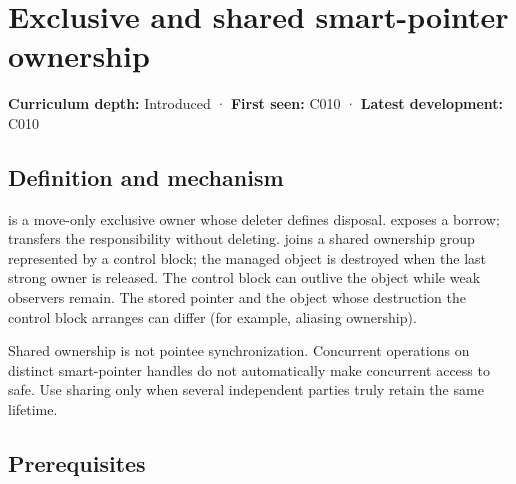 \hypertarget{appendix-51602cabe815}{}\label{referencestart:appendix-51602cabe815}
\section{Exclusive and shared smart-pointer ownership}\label{appendix-51602cabe815-exclusive-and-shared-smart-pointer-ownership}

\hypertarget{appendix-51602cabe815-exclusive-and-shared-smart-pointer-ownership}{}

\textbf{Curriculum depth:} Introduced · \textbf{First seen:} C010 · \textbf{Latest development:} C010

\begin{allmightroledefinition}

\subsection{Definition and mechanism}\label{appendix-51602cabe815-definition-and-mechanism}

\hypertarget{appendix-51602cabe815-definition-and-mechanism}{}

 is a move-only exclusive owner whose deleter  defines disposal.  exposes a borrow;  transfers the responsibility without deleting.  joins a shared ownership group represented by a control block; the managed object is destroyed when the last strong owner is released. The control block can outlive the object while weak observers remain. The stored pointer and the object whose destruction the control block arranges can differ (for example, aliasing ownership).

\end{allmightroledefinition}

Shared ownership is not pointee synchronization. Concurrent operations on distinct smart-pointer handles do not automatically make concurrent access to  safe. Use sharing only when several independent parties truly retain the same lifetime.

\subsection{Prerequisites}\label{appendix-51602cabe815-prerequisites}

\hypertarget{appendix-51602cabe815-prerequisites}{}

